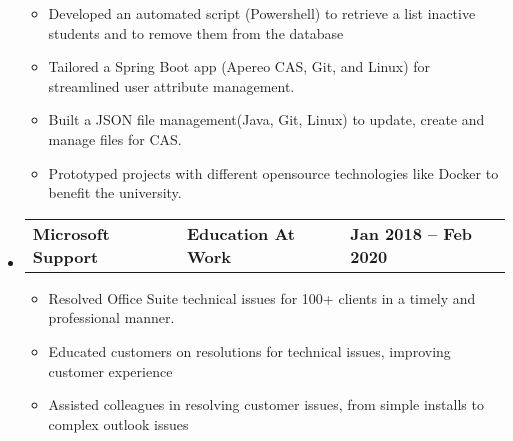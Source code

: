 \documentclass[letterpaper,12pt]{article}
\begin{document}
\begin{itemize}[leftmargin=0.05in, label={}]
{	            \begin{itemize}[label=$\bullet$]
					\item{Developed an automated script (Powershell) to retrieve a list inactive students and to remove them from the database}
		            \item{Tailored a Spring Boot app (Apereo CAS, Git, and Linux) for streamlined user attribute management.}
		            \item{Built a JSON file management(Java, Git, Linux) to update, create and manage
					files for CAS.}
					\item{Prototyped projects with different opensource technologies like Docker to benefit the university.}
					\linebreak
	            \end{itemize}
	      }

	\item{
	            \begin{tabu} {X[l] X[c] X[r]}
		            \textbf{Microsoft Support} & \textbf{Education At Work} & \textbf{Jan 2018 -- Feb 2020} \\
	            \end{tabu}
	            \begin{itemize} [label=$\bullet$]
		            \item{Resolved Office Suite technical issues for 100+ clients in a timely and professional
					manner.}
		            \item{Educated customers on resolutions for technical issues, improving customer experience}
		            \item{Assisted colleagues in resolving customer issues, from simple installs to complex outlook issues}
	          
				\end{itemize}
	      }

		  

\end{itemize}


\end{document}
